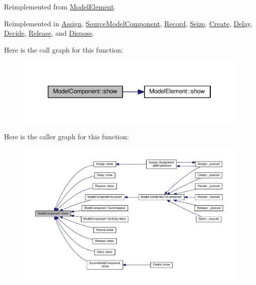 Reimplemented from \hyperlink{class_model_element_af084d684e8effe5cd4c2265abc98896c}{Model\+Element}.



Reimplemented in \hyperlink{class_assign_af5022b92204adcd9ee3e444b7e316d07}{Assign}, \hyperlink{class_source_model_component_a4011597b5780fcc0495e8e22ab8158f6}{Source\+Model\+Component}, \hyperlink{class_record_aa2e77e0277c38e76541ec5811e0379ab}{Record}, \hyperlink{class_seize_a495ace3a156680b5816c8b285135322c}{Seize}, \hyperlink{class_create_a8d1832d2165bbeea4a5a88aded883f86}{Create}, \hyperlink{class_delay_af8187e4515417b547dc22b5ee0a1f95d}{Delay}, \hyperlink{class_decide_a19e2a1143403795bcfd83903a1c0f695}{Decide}, \hyperlink{class_release_a1ec7b35553820f0f228f31be1df468c3}{Release}, and \hyperlink{class_dispose_aee8ef98d5ca22eb18a97b258ed059865}{Dispose}.



Here is the call graph for this function\+:\nopagebreak
\begin{figure}[H]
\begin{center}
\leavevmode
\includegraphics[width=346pt]{class_model_component_ad8bc846e36b028eab7efb7da6c549eca_cgraph}
\end{center}
\end{figure}




Here is the caller graph for this function\+:\nopagebreak
\begin{figure}[H]
\begin{center}
\leavevmode
\includegraphics[width=350pt]{class_model_component_ad8bc846e36b028eab7efb7da6c549eca_icgraph}
\end{center}
\end{figure}


